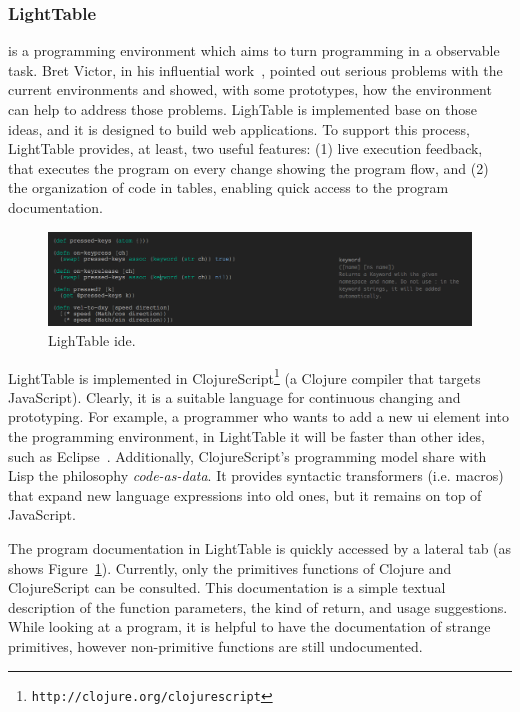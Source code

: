 \subsubsection{LightTable} is a programming environment which aims to turn programming in a observable task. Bret Victor, in his influential work~\cite{inventingPrin,learnableProg}, pointed out serious problems with the current environments and showed, with some prototypes, how the environment can help to address those problems. LighTable is implemented base on those ideas, and it is designed to build web applications. To support this process, LightTable provides, at least, two useful features: (1) live execution feedback, that executes the program on every change showing the program flow, and (2) the organization of code in tables, enabling quick access to the program documentation.

\begin{figure}[!htbp]
\vspace{-10pt}
  \centering
  \includegraphics[width=1.0\textwidth]{img/lt2}
    \vspace{-20pt}
    \caption{LighTable \ac{ide}.}
    \vspace{-10pt}  
  \label{fig:lt}
\end{figure} 

LightTable is implemented in ClojureScript\footnote{\texttt{http://clojure.org/clojurescript}} (a Clojure compiler that targets JavaScript). Clearly, it is a suitable language for continuous changing and prototyping. For example, a programmer who wants to add a new \ac{ui} element into the programming environment, in LightTable it will be faster than other \ac{ide}s, such as Eclipse~\cite{carlson2005eclipse}. Additionally, ClojureScript's programming model share with Lisp the philosophy \textit{code-as-data}. It provides syntactic transformers (i.e. macros) that expand new language expressions into old ones, but it remains on top of JavaScript.

The program documentation in LightTable is quickly accessed by a lateral tab (as shows Figure~\ref{fig:lt}). Currently, only the primitives functions of Clojure and ClojureScript can be consulted. This documentation is a simple textual description of the function parameters, the kind of return, and usage suggestions. While looking at a program, it is helpful to have the documentation of strange primitives, however non-primitive functions are still undocumented. 

